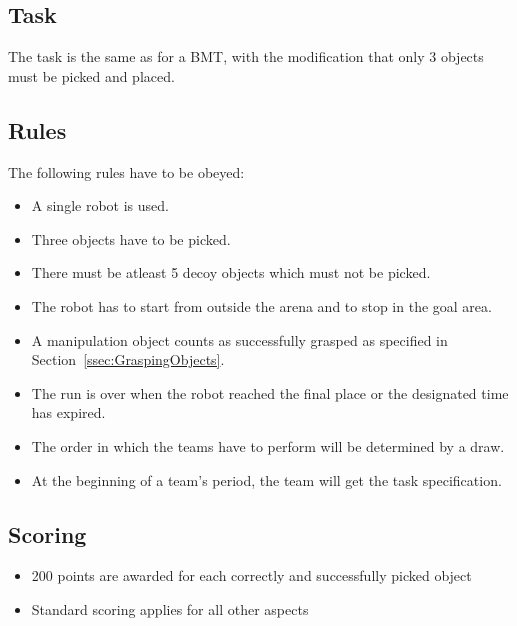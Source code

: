 \subsection{Task}

The task is the same as for a BMT, with the modification that only 3 objects must be picked and placed.

\subsection{Rules}
The following rules have to be obeyed:

\begin{itemize}
\item A single robot is used.
\item Three objects have to be picked.
\item There must be atleast 5 decoy objects which must not be picked.
\item The robot has to start from outside the arena and to stop in the goal area.
\item A manipulation object counts as successfully grasped as specified in Section~\ref{ssec:GraspingObjects}.
\item The run is over when the robot reached the final place or the designated time has expired.
\item The order in which the teams have to perform will be determined by a draw.
\item At the beginning of a team's period, the team will get the task specification.
\end{itemize}

\subsection{Scoring}
\begin{itemize}
\item 200 points are awarded for each correctly and successfully picked object
\item Standard scoring applies for all other aspects
\end{itemize}
